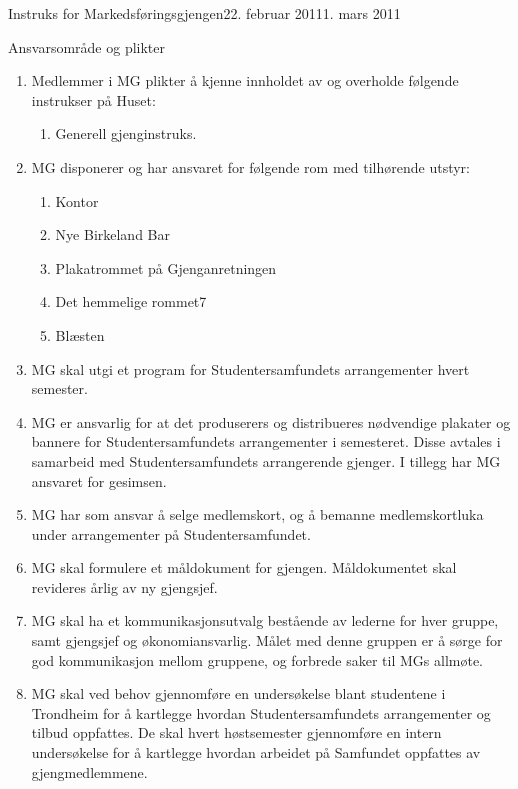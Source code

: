 \begin{instruks}{Instruks for Markedsføringsgjengen}{22. februar 2011}{1. mars 2011 }
    \begin{instruksledd}{Ansvarsområde og plikter}
        \begin{enumerate}   
            \item  Medlemmer i MG plikter å kjenne innholdet av og overholde følgende instrukser på
                Huset:
                \begin{enumerate}
                    \item Generell gjenginstruks.
                \end{enumerate}
            \item MG disponerer og har ansvaret for følgende rom med tilhørende utstyr:
                \begin{enumerate}
                    \item Kontor
                    \item Nye Birkeland Bar
                    \item Plakatrommet på Gjenganretningen
                    \item Det hemmelige rommet7
                    \item Blæsten
                \end{enumerate}
            \item MG skal utgi et program for
                Studentersamfundets arrangementer hvert semester.
            \item MG er ansvarlig for at det
                produserers og distribueres nødvendige plakater og bannere for
                Studentersamfundets
                arrangementer i semesteret. Disse avtales i samarbeid med Studentersamfundets
                arrangerende
                gjenger. I tillegg har MG ansvaret for gesimsen.
            \item MG har som ansvar å selge medlemskort, og å
                bemanne medlemskortluka under arrangementer på Studentersamfundet.
            \item MG skal formulere et måldokument for
                gjengen. Måldokumentet skal revideres årlig av ny gjengsjef.
            \item MG skal ha et kommunikasjonsutvalg
                bestående av lederne for hver gruppe, samt gjengsjef og
                økonomiansvarlig. Målet med denne gruppen er å sørge for god kommunikasjon mellom gruppene, og
                forbrede saker til MGs allmøte.
            \item MG skal ved behov gjennomføre en
                undersøkelse blant studentene i Trondheim for å kartlegge
                hvordan Studentersamfundets arrangementer og tilbud oppfattes. De skal hvert høstsemester
                gjennomføre en
                intern undersøkelse for å kartlegge hvordan arbeidet på Samfundet oppfattes av gjengmedlemmene.
        \end{enumerate}
    \end{instruksledd}


\end{instruks}
